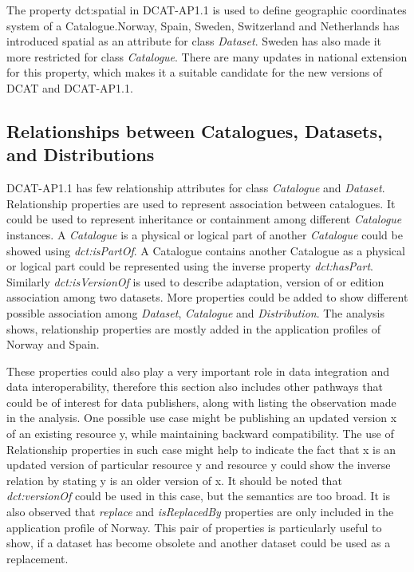 \documentclass[<options>]{elsarticle}
\begin{document}
The property dct:spatial in DCAT-AP1.1 is used to define geographic coordinates system of a Catalogue.Norway, Spain, Sweden, Switzerland and Netherlands has introduced spatial as an attribute for class\textit{ Dataset}. Sweden has also made it more restricted for class \textit{Catalogue}. There are many updates in national extension for this property, which makes it a suitable candidate for the new versions of DCAT and DCAT-AP1.1.

\subsection{Relationships between Catalogues, Datasets, and Distributions}
DCAT-AP1.1 has few relationship attributes for class\textit{ Catalogue} and \textit{Dataset}. Relationship properties are used to represent association between catalogues. It could be used to represent inheritance or containment among different \textit{Catalogue} instances. A \textit{Catalogue} is a physical or logical part of another \textit{Catalogue} could be showed using \textit{dct:isPartOf}. A Catalogue contains another Catalogue as a physical or logical part could be represented using the inverse property \textit{dct:hasPart}. Similarly \textit{dct:isVersionOf }is used to describe adaptation, version of or edition association among two datasets. More properties could be added to show different possible association among\textit{ Dataset}, \textit{Catalogue} and \textit{Distribution}. The analysis shows, relationship properties are mostly added in the application profiles of Norway and Spain.

These properties could also play a very important role in data integration and data interoperability, therefore this section also includes other pathways that could be of interest for data publishers, along with listing the observation made in the analysis. One possible use case might be publishing an updated version x of an existing resource y, while maintaining backward compatibility. The use of Relationship properties in such case might help to indicate the fact that x is an updated version of particular resource y and resource y could show the inverse relation by stating y is an older version of x. It should be noted that \textit{dct:versionOf} could be used in this case, but the semantics are too broad. It is also observed that \textit{replace} and \textit{isReplacedBy} properties are only included in the application profile of Norway. This pair of properties is particularly useful to show, if a dataset has become obsolete and another dataset could be used as a replacement.
\end{document}
